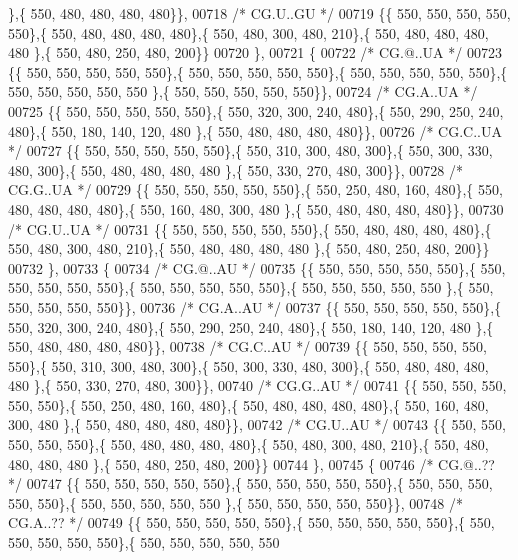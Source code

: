 \begin{DoxyCode}
      \},\{ 550, 480, 480, 480, 480\}\},
00718 \textcolor{comment}{/* CG.U..GU */}
00719 \{\{ 550, 550, 550, 550, 550\},\{ 550, 480, 480, 480, 480\},\{ 550, 480, 300, 480, 210\},\{ 550, 480, 480, 480, 480
      \},\{ 550, 480, 250, 480, 200\}\}
00720 \},
00721 \{
00722 \textcolor{comment}{/* CG.@..UA */}
00723 \{\{ 550, 550, 550, 550, 550\},\{ 550, 550, 550, 550, 550\},\{ 550, 550, 550, 550, 550\},\{ 550, 550, 550, 550, 550
      \},\{ 550, 550, 550, 550, 550\}\},
00724 \textcolor{comment}{/* CG.A..UA */}
00725 \{\{ 550, 550, 550, 550, 550\},\{ 550, 320, 300, 240, 480\},\{ 550, 290, 250, 240, 480\},\{ 550, 180, 140, 120, 480
      \},\{ 550, 480, 480, 480, 480\}\},
00726 \textcolor{comment}{/* CG.C..UA */}
00727 \{\{ 550, 550, 550, 550, 550\},\{ 550, 310, 300, 480, 300\},\{ 550, 300, 330, 480, 300\},\{ 550, 480, 480, 480, 480
      \},\{ 550, 330, 270, 480, 300\}\},
00728 \textcolor{comment}{/* CG.G..UA */}
00729 \{\{ 550, 550, 550, 550, 550\},\{ 550, 250, 480, 160, 480\},\{ 550, 480, 480, 480, 480\},\{ 550, 160, 480, 300, 480
      \},\{ 550, 480, 480, 480, 480\}\},
00730 \textcolor{comment}{/* CG.U..UA */}
00731 \{\{ 550, 550, 550, 550, 550\},\{ 550, 480, 480, 480, 480\},\{ 550, 480, 300, 480, 210\},\{ 550, 480, 480, 480, 480
      \},\{ 550, 480, 250, 480, 200\}\}
00732 \},
00733 \{
00734 \textcolor{comment}{/* CG.@..AU */}
00735 \{\{ 550, 550, 550, 550, 550\},\{ 550, 550, 550, 550, 550\},\{ 550, 550, 550, 550, 550\},\{ 550, 550, 550, 550, 550
      \},\{ 550, 550, 550, 550, 550\}\},
00736 \textcolor{comment}{/* CG.A..AU */}
00737 \{\{ 550, 550, 550, 550, 550\},\{ 550, 320, 300, 240, 480\},\{ 550, 290, 250, 240, 480\},\{ 550, 180, 140, 120, 480
      \},\{ 550, 480, 480, 480, 480\}\},
00738 \textcolor{comment}{/* CG.C..AU */}
00739 \{\{ 550, 550, 550, 550, 550\},\{ 550, 310, 300, 480, 300\},\{ 550, 300, 330, 480, 300\},\{ 550, 480, 480, 480, 480
      \},\{ 550, 330, 270, 480, 300\}\},
00740 \textcolor{comment}{/* CG.G..AU */}
00741 \{\{ 550, 550, 550, 550, 550\},\{ 550, 250, 480, 160, 480\},\{ 550, 480, 480, 480, 480\},\{ 550, 160, 480, 300, 480
      \},\{ 550, 480, 480, 480, 480\}\},
00742 \textcolor{comment}{/* CG.U..AU */}
00743 \{\{ 550, 550, 550, 550, 550\},\{ 550, 480, 480, 480, 480\},\{ 550, 480, 300, 480, 210\},\{ 550, 480, 480, 480, 480
      \},\{ 550, 480, 250, 480, 200\}\}
00744 \},
00745 \{
00746 \textcolor{comment}{/* CG.@..?? */}
00747 \{\{ 550, 550, 550, 550, 550\},\{ 550, 550, 550, 550, 550\},\{ 550, 550, 550, 550, 550\},\{ 550, 550, 550, 550, 550
      \},\{ 550, 550, 550, 550, 550\}\},
00748 \textcolor{comment}{/* CG.A..?? */}
00749 \{\{ 550, 550, 550, 550, 550\},\{ 550, 550, 550, 550, 550\},\{ 550, 550, 550, 550, 550\},\{ 550, 550, 550, 550, 550

\end{DoxyCode}
